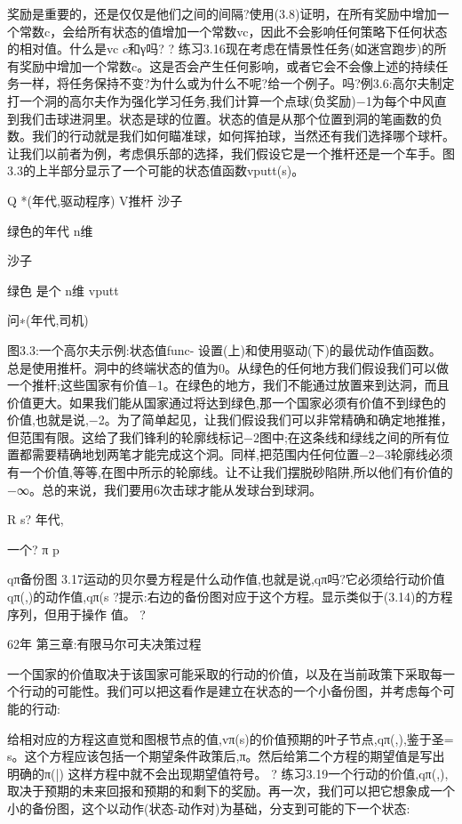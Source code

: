 奖励是重要的，还是仅仅是他们之间的间隔?使用(3.8)证明，在所有奖励中增加一个常数c，会给所有状态的值增加一个常数vc，因此不会影响任何策略下任何状态的相对值。什么是vc
c和γ吗? 					?
练习3.16现在考虑在情景性任务(如迷宫跑步)的所有奖励中增加一个常数c。这是否会产生任何影响，或者它会不会像上述的持续任务一样，将任务保持不变?为什么或为什么不呢?给一个例子。吗?例3.6:高尔夫制定打一个洞的高尔夫作为强化学习任务,我们计算一个点球(负奖励)−1为每个中风直到我们击球进洞里。状态是球的位置。状态的值是从那个位置到洞的笔画数的负数。我们的行动就是我们如何瞄准球，如何挥拍球，当然还有我们选择哪个球杆。让我们以前者为例，考虑俱乐部的选择，我们假设它是一个推杆还是一个车手。图3.3的上半部分显示了一个可能的状态值函数vputt(s)。




Q *(年代,驱动程序)
V推杆
沙子

绿色的年代
n维




沙子




绿色
是个
n维
vputt




问∗(年代,司机)

图3.3:一个高尔夫示例:状态值func-
设置(上)和使用驱动(下)的最优动作值函数。
总是使用推杆。洞中的终端状态的值为0。从绿色的任何地方我们假设我们可以做一个推杆;这些国家有价值−1。在绿色的地方，我们不能通过放置来到达洞，而且价值更大。如果我们能从国家通过将达到绿色,那一个国家必须有价值不到绿色的价值,也就是说,−2。为了简单起见，让我们假设我们可以非常精确和确定地推推，但范围有限。这给了我们锋利的轮廓线标记−2图中;在这条线和绿线之间的所有位置都需要精确地划两笔才能完成这个洞。同样,把范围内任何位置−2−3轮廓线必须有一个价值,等等,在图中所示的轮廓线。让不让我们摆脱砂陷阱,所以他们有价值的−∞。总的来说，我们要用6次击球才能从发球台到球洞。


R
s?
年代,




一个?
π
p




qπ备份图
3.17运动的贝尔曼方程是什么动作值,也就是说,qπ吗?它必须给行动价值qπ(,)的动作值,qπ(s ?提示:右边的备份图对应于这个方程。显示类似于(3.14)的方程序列，但用于操作
值。 					?

62年 					第三章:有限马尔可夫决策过程



一个国家的价值取决于该国家可能采取的行动的价值，以及在当前政策下采取每一个行动的可能性。我们可以把这看作是建立在状态的一个小备份图，并考虑每个可能的行动:

给相对应的方程这直觉和图根节点的值,vπ(s)的价值预期的叶子节点,qπ(,),鉴于圣= s。这个方程应该包括一个期望条件政策后,π。然后给第二个方程的期望值是写出明确的π(|)
这样方程中就不会出现期望值符号。 					?
练习3.19一个行动的价值,qπ(,),取决于预期的未来回报和预期的和剩下的奖励。再一次，我们可以把它想象成一个小的备份图，这个以动作(状态-动作对)为基础，分支到可能的下一个状态:

